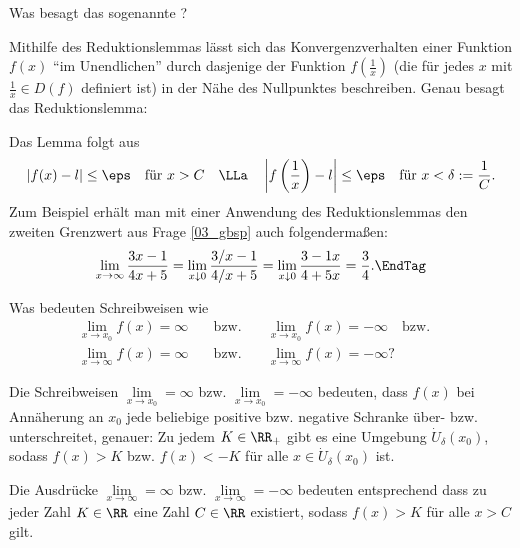 \begin{frage}
  Was besagt das sogenannte ?
\end{frage}

\begin{antwort}
  Mithilfe des Reduktionslemmas lässt sich das Konvergenzverhalten 
  einer Funktion $f(x)$ "`im Unendlichen"' durch dasjenige der Funktion 
  $f \left( \frac{1}{x} \right)$ 
  (die für jedes $x$ mit $\frac{1}{x} \in D(f)$ definiert ist)  
  in der Nähe des Nullpunktes beschreiben. 
  Genau besagt das Reduktionslemma: 

  \medskip\noindent
  \noindent
  Das Lemma folgt aus
  \[
  | f(x) - l | \le \eps \quad\text{für $x>C$} 
  \quad \LLa \quad
  \left| f\left(\frac{1}{x}\right) - l \right| 
  \le \eps \quad\text{für $x< \delta := \frac{1}{C}$} 
  . \]
  Zum Beispiel erhält man mit einer 
  Anwendung des Reduktionslemmas den zweiten Grenzwert 
  aus Frage \ref{03_gbsp} auch folgendermaßen: 
  \begin{equation}
    \lim_{x\to\infty} \frac{3x-1}{4x+5} =
    \lim_{x\downarrow 0} \frac{3/x-1}{4/x+5} = 
    \lim_{x\downarrow 0} \frac{3-1x}{4+5x} = \frac{3}{4}.
    \EndTag
  \end{equation}
\end{antwort}

\begin{frage}
  Was bedeuten Schreibweisen wie 
  \begin{eqnarray*}
    \lim_{x\to x_0}f(x) = \infty &\quad\text{bzw.}\quad&
    \lim_{x\to x_0}f(x) = -\infty \quad\text{bzw.}\quad \\
    \lim_{x\to\infty}f(x) = \infty &\quad\text{bzw.}\quad&
    \lim_{x\to\infty}f(x) = -\infty\text{?}
  \end{eqnarray*}
\end{frage}

\begin{antwort}
  Die Schreibweisen $\lim\limits_{x\to x_0} = \infty$ bzw. 
  $\lim\limits_{x\to x_0} = -\infty$ bedeuten, dass $f(x)$ bei 
  Annäherung an $x_0$ jede beliebige positive bzw. negative 
  Schranke über- bzw. unterschreitet, genauer: Zu jedem $K\in \RR_+$ gibt es 
  eine Umgebung $\dot{U}_\delta( x_0 )$, sodass 
  $f(x)>K$ bzw. $f(x)<-K$ für alle $x\in \dot{U}_\delta (x_0)$ ist. 

  Die Ausdrücke $\lim\limits_{x\to\infty} = \infty$ bzw. 
  $\lim\limits_{x\to\infty} = -\infty$ bedeuten entsprechend
  dass zu jeder Zahl $K\in\RR$ eine Zahl $C\in\RR$ existiert, sodass 
  $f(x)>K$ für alle $x>C$ gilt. 
  \AntEnd
\end{antwort}

